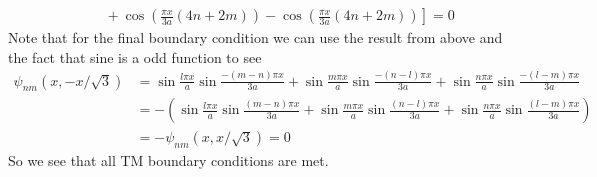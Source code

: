 \documentclass[11pt]{article}
\numberwithin{equation}{section}
\begin{document}
\begin{enumerate}[(a)]
\begin{align*}
        &\qquad+\left.\cos\left(\frac{\pi{x}}{3a}(4n+2m)\right) - \cos\left(\frac{\pi{x}}{3a}(4n+2m)\right)\right]= 0
    \end{align*}
    Note that for the final boundary condition we can use the result from above and the fact
    that sine is a odd function to see
    \begin{align*}
        \psi_{nm}(x,-x/\sqrt{3}) &= \sin\frac{l\pi{x}}{a}\sin\frac{-(m-n)\pi{x}}{3a}
            + \sin\frac{m\pi{x}}{a}\sin\frac{-(n-l)\pi{x}}{3a}
            + \sin\frac{n\pi{x}}{a}\sin\frac{-(l-m)\pi{x}}{3a}\\
        &= -\left(\sin\frac{l\pi{x}}{a}\sin\frac{(m-n)\pi{x}}{3a}
            + \sin\frac{m\pi{x}}{a}\sin\frac{(n-l)\pi{x}}{3a}
            + \sin\frac{n\pi{x}}{a}\sin\frac{(l-m)\pi{x}}{3a}\right)\\
        &= -\psi_{nm}(x,x/\sqrt{3}) = 0
    \end{align*}
    So we see that all TM boundary conditions are met.


\end{enumerate}
\end{document}
